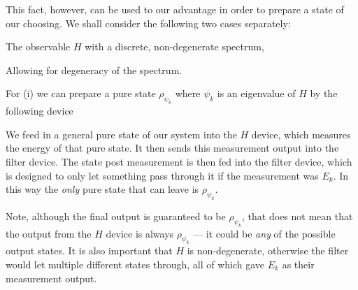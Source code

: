 This fact, however, can be used to our advantage in order to prepare a state of our choosing. We shall consider the following two cases separately:
\ben[label=(\roman*)]
\item The observable $H$ with a discrete, non-degenerate spectrum, 
\item Allowing for degeneracy of the spectrum. 
\een 

For (i) we can prepare a pure state $\rho_{\psi_k}$ where $\psi_k$ is an eigenvalue of $H$ by the following device 

\begin{center}
\end{center}

We feed in a general pure state of our system into the $H$ device, which measures the energy of that pure state. It then sends this measurement output into the filter device. The state post measurement is then fed into the filter device, which is designed to only let something pass through it if the measurement was $E_k$. In this way the \emph{only} pure state that can leave is $\rho_{\psi_k}$. 

Note, although the final output is guaranteed to be $\rho_{\psi_k}$, that does not mean that the output from the $H$ device is always $\rho_{\psi_k}$ --- it could be \emph{any} of the possible output states. It is also important that $H$ is non-degenerate, otherwise the filter would let multiple different states through, all of which gave $E_k$ as their measurement output. 

